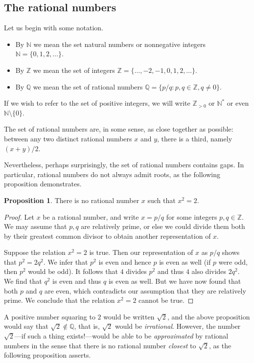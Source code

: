 \documentclass[12pt]{article}
\theoremstyle{definition}
\theoremstyle{theorem}
\newtheorem{proposition}[definition]{Proposition}
\begin{document}
\subsection{The rational numbers}
Let us begin with some notation. 
\begin{itemize}
\item By $\mathbb{N}$ we mean the set natural numbers or nonnegative integers $\mathbb{N} = \{0, 1, 2, \ldots\}$. 
\item By $\mathbb{Z}$ we mean the set of integers $\mathbb{Z} = \{\ldots, -2, -1, 0, 1, 2, \ldots \}$. 
\item By $\mathbb{Q}$ we mean the set of rational numbers $\mathbb{Q} = \{p/q : p, q \in \mathbb{Z}, q \ne 0\}$. 
\end{itemize}
If we wish to refer to the set of positive integers, we will write $\mathbb{Z}_{>0}$ or $\mathbb{N}^*$ or even $\mathbb{N} \setminus \{0\}$. 

The set of rational numbers are, in some sense, as close together as possible: between any two distinct rational numbers $x$ and $y$, there is a third, namely $(x+y)/2$. 

Nevertheless, perhaps surprisingly, the set of rational numbers contains gaps. In particular, rational numbers do not always admit roots, as the following proposition demonstrates.  

\begin{proposition}
There is no rational number $x$ such that $x^2 = 2$. 
\end{proposition}

\begin{proof}
Let $x$ be a rational number, and write $x = p/q$ for some integers $p,q \in \mathbb{Z}$. We may assume that $p,q$ are relatively prime, or else we could divide them both by their greatest common divisor to obtain another representation of $x$. 

Suppose the relation $x^2 = 2$ is true.  Then our representation of $x$ as $p/q$ shows that $p^2 = 2q^2$. We infer that $p^2$ is even and hence $p$ is even as well (if $p$ were odd, then $p^2$ would be odd). It follows that $4$ divides $p^2$ and thus $4$ also divides $2q^2$. We find that $q^2$ is even and thus $q$ is even as well. But we have now found that both $p$ and $q$ are even, which contradicts our assumption that they are relatively prime. We conclude that the relation $x^2 = 2$ cannot be true. 
\end{proof}

A positive number squaring to $2$ would be written $\sqrt{2}$, and the above proposition would say that $\sqrt{2} \notin \mathbb{Q}$, that is, $\sqrt{2}$ would be \emph{irrational}. However, the number $\sqrt{2}$---if such a thing exists!---would be able to be \emph{approximated} by rational numbers in the sense that there is no rational number \emph{closest} to $\sqrt{2}$, as the following proposition asserts. 
\end{document}
